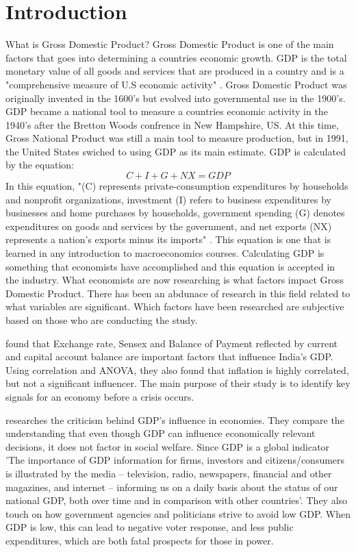 \documentclass[12pt]{article}
\begin{document}
\section*{Introduction}
What is Gross Domestic Product? Gross Domestic Product is one of the main factors that goes into determining a countries economic growth. 
GDP is the total monetary value of all goods and services that are produced in a country and is a "comprehensive measure of U.S economic activity" \citet[]{bea}.
Gross Domestic Product was originally invented in the 1600's but evolved into governmental use in the 1900's. 
GDP became a national tool to measure a countries economic activity in the 1940's after the Bretton Woods confrence in New Hampshire, US.
At this time, Gross National Product was still a main tool to measure production, but in 1991, the United States swiched to using GDP as its main estimate. 
GDP is calculated by the equation: 
\begin{equation}
C + I + G + NX = GDP
\end{equation}
In this equation, "(C) represents private-consumption expenditures by households and nonprofit organizations, investment (I) refers to business expenditures by businesses and home purchases by households, 
government spending (G) denotes expenditures on goods and services by the government, and net exports (NX) represents a nation’s exports minus its imports" \citet[]{brit}.
This equation is one that is learned in any introduction to macroeconomics courses. 
Calculating GDP is something that economists have accomplished and this equation is accepted in the industry. 
What economists are now researching is what factors impact Gross Domestic Product. 
There has been an abdunace of research in this field related to what variables are significant. 
Which factors have been researched are subjective based on those who are conducting the study.

\citet{divya2014study} found that Exchange rate, Sensex and Balance of Payment reflected by current and capital account balance are important factors that influence India’s GDP. 
Using correlation and ANOVA, they also found that inflation is highly correlated, but not a significant influencer. 
The main purpose of their study is to identify key signals for an economy before a crisis occurs. 

\citet{van2009gdp} researches the criticism behind GDP's influence in economies. 
They compare the understanding that even though GDP can influence economically relevant decisions, it does not factor in social welfare.
Since GDP is a global indicator 'The importance of GDP information for firms, investors and citizens/consumers is illustrated by the media – television, radio, newspapers, financial and other magazines, and internet – informing us on a daily basis about the status of our national GDP, both over time and in comparison with other countries'\citet[]{van2009gdp}.
They also touch on how government agencies and politicians strive to avoid low GDP. When GDP is low, this can lead to negative voter response, and less public expenditures, which are both fatal prospects for those in power\citet[]{van2009gdp}.
\end{document}
